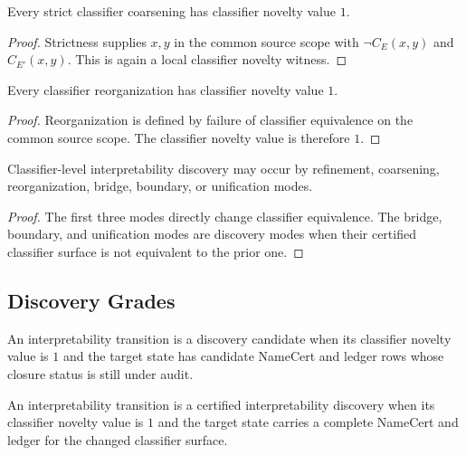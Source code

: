 \begin{theorem}
\label{thm:philosophy-coarsening-creates-classifier-novelty}
Every strict classifier coarsening has classifier novelty value $1$.
\end{theorem}
\begin{proof}
Strictness supplies $x,y$ in the common source scope with
$\neg C_E(x,y)$ and $C_{E'}(x,y)$. This is again a local classifier
novelty witness.
\end{proof}

\begin{theorem}
\label{thm:philosophy-reorganization-creates-classifier-novelty}
Every classifier reorganization has classifier novelty value $1$.
\end{theorem}
\begin{proof}
Reorganization is defined by failure of classifier equivalence on the
common source scope. The classifier novelty value is therefore $1$.
\end{proof}

\begin{corollary}
\label{cor:philosophy-discovery-need-not-only-refine}
Classifier-level interpretability discovery may occur by refinement,
coarsening, reorganization, bridge, boundary, or unification modes.
\end{corollary}
\begin{proof}
The first three modes directly change classifier equivalence. The bridge,
boundary, and unification modes are discovery modes when their certified
classifier surface is not equivalent to the prior one.
\end{proof}

\subsection{Discovery Grades}
\label{subsec:philosophy-discovery-grades}

\begin{definition}
\label{def:philosophy-interpretability-discovery-candidate}
An interpretability transition is a discovery candidate when its
classifier novelty value is $1$ and the target state has candidate
NameCert and ledger rows whose closure status is still under audit.
\end{definition}

\begin{definition}
\label{def:philosophy-certified-interpretability-discovery}
An interpretability transition is a certified interpretability discovery
when its classifier novelty value is $1$ and the target state carries a
complete NameCert and ledger for the changed classifier surface.
\end{definition}

